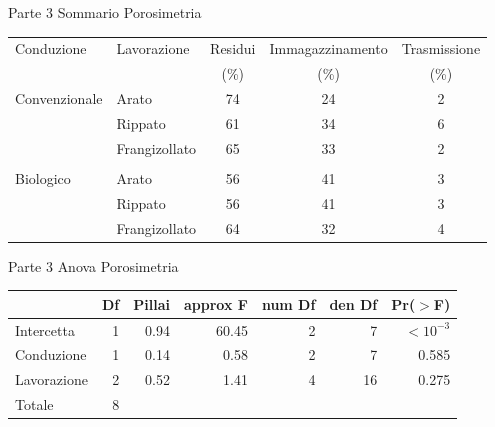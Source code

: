 \documentclass[10pt]{beamer}
\begin{document}
\begin{frame}{Parte 3 \small{Sommario Porosimetria}}

\footnotesize
\begin{table}[hb]
\centering
\begin{tabular}{llccc}%
  \hline
  Conduzione & Lavorazione & Residui & Immagazzinamento &
                                                          Trasmissione \\ 
             &             & (\%) &  (\%) &  (\%) \\ 
  \hline
  Convenzionale & Arato & 74 & 24 & 2 \\ 
             & Rippato & 61 & 34 & 6 \\ 
             & Frangizollato & 65 & 33 & 2 \\ 
             &  &  &  &  \\ 
  Biologico & Arato & 56 & 41 & 3 \\ 
             & Rippato & 56 & 41 & 3 \\ 
             & Frangizollato & 64 & 32 & 4 \\ 
  \hline
\end{tabular}
\end{table}
\end{frame}

\begin{frame}{Parte 3 \small{Anova Porosimetria}}
\begin{table}[ht]
\centering
\begin{tabular}{lrrrrrr}
  \hline
             & Df & Pillai & approx F & num Df & den Df & Pr($>$F) \\ 
  \hline
  Intercetta & 1 & 0.94 & 60.45 & 2 & 7 & $<10^{-3}$ \\ 
  Conduzione & 1 & 0.14 & 0.58 & 2 & 7 & 0.585 \\ 
  Lavorazione & 2 & 0.52 & 1.41 & 4 & 16 & 0.275 \\ 
  Totale & 8 &  &  &  &  &  \\ 
   \hline
\end{tabular}
\end{table}
\end{frame}
\end{document}
